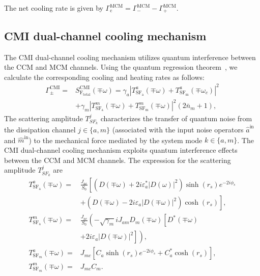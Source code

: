 \documentclass[aps, prresearch, reprint, nofootinbib, longbibliography]{revtex4-2}
\begin{document}
The net cooling rate is given by
$
\Gamma_{\text{c}}^{\text{MCM}} = \Gamma_{-}^{\text{MCM}} - \Gamma_{+}^{\text{MCM}}. 
$
\subsection{CMI dual-channel cooling mechanism}
\label{subsec:cmd}
The CMI dual-channel cooling mechanism utilizes quantum interference between the CCM and MCM channels.  Using the quantum regression theorem~\cite{PhysRev.129.2342,1998Introduction}, we calculate the corresponding cooling and heating rates as follows:
\begin{align}
	\Gamma_{\pm}^{\text{CMI}} = &S_\mathrm{F_{total}}^{\mathrm{CMI}} (\mp\omega) = \gamma_a\left| T^a_\mathrm{SF_a} (\mp\omega) + T^a_\mathrm{SF_m}(\mp\omega_c) \right|^2 \nonumber \\
	& + \gamma_m\left| T^m_\mathrm{SF_a} (\mp\omega) + T^m_\mathrm{SF_m} (\mp\omega) \right|^2 (2\bar{n}_m+1),
	\label{eq:22}
\end{align}
The scattering amplitude $T_{SF_k}^j$ characterizes the transfer of quantum noise from the dissipation channel $j \in \{a, m\}$ (associated with the input noise operators $\hat{a}^{\mathrm{in}}$ and $\hat{m}^{\mathrm{in}}$) to the mechanical force mediated by the system mode $k \in \{a, m\}$. The CMI dual-channel cooling mechanism exploits quantum interference effects between the CCM and MCM channels. The expression for the scattering amplitude $T_{SF_k}^j$ are
\begin{align}
	T^a_\mathrm{SF_a}(\mp\omega) = &\frac{J_{ac}}{S_0} \left[ \left( D(\mp\omega) + 2i \varepsilon_a^* |D(\omega)|^2 \right) \sinh (r_s) e^{-2i\phi_s} \right. \nonumber \\
	& \left. + \left( D(\mp\omega) - 2i \varepsilon_a |D(\mp\omega)|^2 \right) \cosh (r_s) \right], \nonumber \\
	T^m_\mathrm{SF_a}(\mp\omega) = &\frac{J_{ac}}{S_0} \left( -\sqrt{\gamma_m} i J_{am} D_m(\mp\omega) \left[ D^*(\mp\omega) \right. \right. \nonumber \\
	& \left. \left. + 2i \varepsilon_a |D(\mp\omega)|^2 \right] \right), \nonumber \\
	T^a_{\mathrm{SF}_m}(\mp\omega) = &J_{mc}[C_a \sinh(r_s)e^{-2i\phi_{s}} + C^*_{a} \cosh(r_s)], \nonumber \\
	T^m_{\mathrm{SF}_m}(\mp\omega) = &J_{mc} C_m.
	\label{eq:1}
\end{align}
\end{document}
